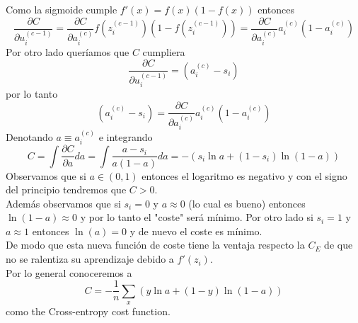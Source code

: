 \documentclass{article}
\begin{document}
Como la sigmoide cumple $f'(x)=f(x)(1-f(x)) $ entonces
$$\frac{\partial C}{\partial u^{(c-1)}_i}=\frac{\partial C}{\partial a_i^{(c)}}f(z_i^{(c-1)})(1-f(z_i^{(c-1)}))=\frac{\partial C}{\partial a_i^{(c)}}a_i^{(c)}(1-a_i^{(c)}) $$
Por otro lado queríamos que $C$ cumpliera
$$\frac{\partial C}{\partial u^{(c-1)}_i}=(a_i^{(c)}-s_i) $$
por lo tanto
$$(a_i^{(c)}-s_i)=\frac{\partial C}{\partial a_i^{(c)}}a_i^{(c)}(1-a_i^{(c)}) $$
Denotando $a\equiv a_i^{(c)}$ e integrando
$$C=\int \frac{\partial C}{\partial a} da=\int \frac{a-s_i}{a(1-a)} da= -\left(s_i\ln{a}+(1-s_i)\ln{(1-a)}\right)$$
Observamos que si $a\in(0,1) $ entonces el logaritmo es negativo y con el signo del principio tendremos que $C>0$.\\

Además observamos que si $s_i=0$ y $a\approx 0$ (lo cual es bueno) entonces $\ln(1-a)\approx 0 $ y por lo tanto el "coste" será mínimo. Por otro lado si $s_i=1$ y $a\approx 1$ entonces $\ln(a)=0$ y de nuevo el coste es mínimo.\\

De modo que esta nueva función de coste tiene la ventaja respecto la $C_E$ de que no se ralentiza su aprendizaje debido a $f'(z_i)$.\\

Por lo general conoceremos a
$$C=-\frac{1}{n}\sum_x\left(y\ln{a}+(1-y)\ln{(1-a)}\right) $$
como the Cross-entropy cost function.\\
\end{document}

